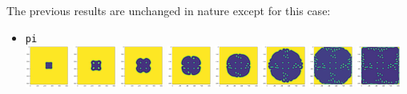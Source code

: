 The previous results are unchanged in nature except for this case:
\begin{itemize}

\item {\tt pi} \\
\includegraphics[height=1.4cm]{python_codes/fieldstone_171/pearson93_hr/pi_solution_0001000_u.png}
\includegraphics[height=1.4cm]{python_codes/fieldstone_171/pearson93_hr/pi_solution_0005000_u.png}
\includegraphics[height=1.4cm]{python_codes/fieldstone_171/pearson93_hr/pi_solution_0010000_u.png}
\includegraphics[height=1.4cm]{python_codes/fieldstone_171/pearson93_hr/pi_solution_0015000_u.png}
\includegraphics[height=1.4cm]{python_codes/fieldstone_171/pearson93_hr/pi_solution_0020000_u.png}
\includegraphics[height=1.4cm]{python_codes/fieldstone_171/pearson93_hr/pi_solution_0030000_u.png}
\includegraphics[height=1.4cm]{python_codes/fieldstone_171/pearson93_hr/pi_solution_0040000_u.png}
\includegraphics[height=1.4cm]{python_codes/fieldstone_171/pearson93_hr/pi_solution_0050000_u.png}

\end{itemize}
